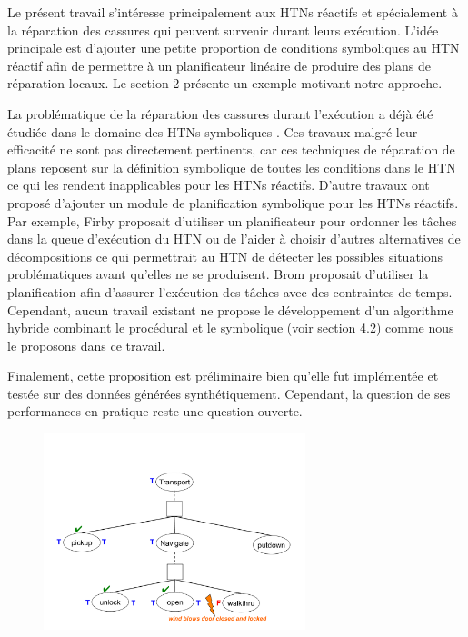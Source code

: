 \documentclass[a4paper,twoside,french]{article}
\begin{document}
				\par Le présent travail s'intéresse principalement aux HTNs réactifs et spécialement à la réparation des cassures qui peuvent survenir durant leurs exécution. L'idée principale est d'ajouter une petite proportion de conditions symboliques au HTN réactif  afin de permettre à un planificateur linéaire de produire des plans de réparation locaux. Le section 2 présente un exemple motivant notre approche. 
				\par La problématique de la réparation des cassures durant l'exécution a déjà été étudiée dans le domaine des HTNs symboliques \cite{boella2002replanning,van2005plan,ayan2007hotride,warfield2007adaptation}. Ces travaux malgré leur efficacité ne sont pas directement pertinents,  car ces techniques de réparation de plans reposent sur la définition symbolique de toutes les conditions dans le HTN ce qui les rendent inapplicables pour les HTNs réactifs.  D'autre travaux ont proposé d'ajouter un module de planification symbolique pour les HTNs réactifs. Par exemple, Firby \cite{firby1987investigation} proposait d'utiliser un planificateur pour ordonner les tâches dans la queue d'exécution du HTN ou de l'aider à choisir d'autres alternatives de décompositions ce qui permettrait au HTN de  détecter les possibles situations problématiques avant qu'elles ne se produisent. Brom \cite{brom2005hierarchical} proposait d'utiliser la planification afin d'assurer l'exécution des tâches avec des contraintes de temps. Cependant, aucun travail existant ne propose le développement d'un  algorithme hybride combinant le procédural et le symbolique (voir section 4.2) comme nous le proposons dans ce travail.  
				\par Finalement, cette proposition est préliminaire bien qu'elle fut implémentée et testée sur des données générées synthétiquement. Cependant, la question de ses performances en pratique reste une question ouverte. 
				\begin{figure}[t]
					\centerline{\includegraphics[width=3in]{figs/wind}}
					\vskip 8pt
				\end{figure}
	
\end{document}
